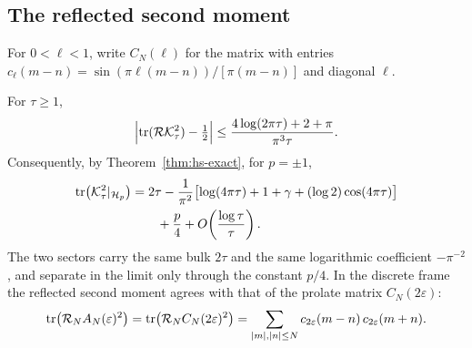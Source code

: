 \subsection{The reflected second moment}
For $0<\ell<1$, write $C_N(\ell)$ for the matrix with entries $c_\ell(m-n)=\sin(\pi\ell(m-n))/[\pi(m-n)]$ and diagonal $\ell$.
\begin{proposition}\label{prop:parity-hs}
For $\tau\ge1$,
\begin{equation}\label{eq:parity-defect}
 \Bigl|\operatorname{tr}(\mathcal R\mathcal K_\tau^2)-\tfrac12\Bigr|
 \le\frac{4\log(2\pi\tau)+2+\pi}{\pi^3\tau}.
\end{equation}
Consequently, by Theorem~\ref{thm:hs-exact}, for $p=\pm1$,
\begin{equation}\label{eq:parity-sector}
\begin{split}
 \operatorname{tr}\bigl(\mathcal K_\tau^2|_{\mathcal H_p}\bigr)
 &=2\tau-\frac1{\pi^2}
    \bigl[\log(4\pi\tau)+1+\gamma+(\log2)\cos(4\pi\tau)\bigr]\\
 &\qquad+\frac p4+O\!\left(\frac{\log\tau}\tau\right).
\end{split}
\end{equation}
The two sectors carry the same bulk $2\tau$ and the same logarithmic
coefficient $-\pi^{-2}$, and separate in the limit only through the constant
$p/4$.  In the discrete frame the reflected second moment agrees with that of the
prolate matrix $C_N(2\varepsilon)$:
\begin{equation}\label{eq:parity-finite}
 \operatorname{tr}\bigl(\mathcal R_NA_N(\varepsilon)^2\bigr)
 =\operatorname{tr}\bigl(\mathcal R_NC_N(2\varepsilon)^2\bigr)
 =\sum_{|m|,|n|\le N}c_{2\varepsilon}(m-n)\,c_{2\varepsilon}(m+n).
\end{equation}
\end{proposition}
